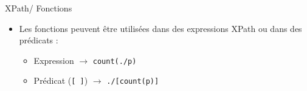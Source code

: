 \documentclass{beamer}
\begin{document}
    \begin{frame}{XPath/ Fonctions}
        \Large
        \begin{itemize}
            \item Les fonctions peuvent être utilisées dans des expressions XPath ou dans des prédicats :
            \begin{itemize}
            \Large
                \item Expression $\rightarrow$ \texttt{count(./p)}
                \item Prédicat (\texttt{[ ]}) $\rightarrow$ \texttt{./[count(p)]}
            \end{itemize}
        \end{itemize}
    \end{frame}
\end{document}
